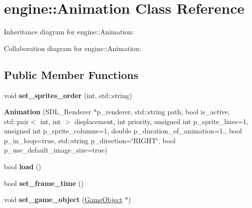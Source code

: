 \hypertarget{classengine_1_1_animation}{}\section{engine\+:\+:Animation Class Reference}
\label{classengine_1_1_animation}


Inheritance diagram for engine\+:\+:Animation\+:


Collaboration diagram for engine\+:\+:Animation\+:
\subsection*{Public Member Functions}
\begin{DoxyCompactItemize}
\item 
void {\bfseries set\+\_\+sprites\+\_\+order} (int, std\+::string)\hypertarget{classengine_1_1_animation_a027ec68d45a5226248c13cd14b1c5f2a}{}\label{classengine_1_1_animation_a027ec68d45a5226248c13cd14b1c5f2a}

\item 
{\bfseries Animation} (S\+D\+L\+\_\+\+Renderer $\ast$p\+\_\+renderer, std\+::string path, bool is\+\_\+active, std\+::pair$<$ int, int $>$ displacement, int priority, unsigned int p\+\_\+sprite\+\_\+lines=1, unsigned int p\+\_\+sprite\+\_\+columns=1, double p\+\_\+duration\+\_\+of\+\_\+animation=1., bool p\+\_\+in\+\_\+loop=true, std\+::string p\+\_\+direction=\char`\"{}R\+I\+G\+HT\char`\"{}, bool p\+\_\+use\+\_\+default\+\_\+image\+\_\+size=true)\hypertarget{classengine_1_1_animation_aa2cfdba04398181a816a77ee27d46868}{}\label{classengine_1_1_animation_aa2cfdba04398181a816a77ee27d46868}

\item 
bool {\bfseries load} ()\hypertarget{classengine_1_1_animation_a1c98b3767d4c63f9ef080fbaf913b06c}{}\label{classengine_1_1_animation_a1c98b3767d4c63f9ef080fbaf913b06c}

\item 
bool {\bfseries set\+\_\+frame\+\_\+time} ()\hypertarget{classengine_1_1_animation_a419f0c0142e424ea4b65d5f5f0442c8e}{}\label{classengine_1_1_animation_a419f0c0142e424ea4b65d5f5f0442c8e}

\item 
void {\bfseries set\+\_\+game\+\_\+object} (\hyperlink{classengine_1_1_game_object}{Game\+Object} $\ast$)\hypertarget{classengine_1_1_animation_a8c2c7a2d4f9053429910acca480fcb99}{}\label{classengine_1_1_animation_a8c2c7a2d4f9053429910acca480fcb99}


\end{DoxyCompactItemize}

